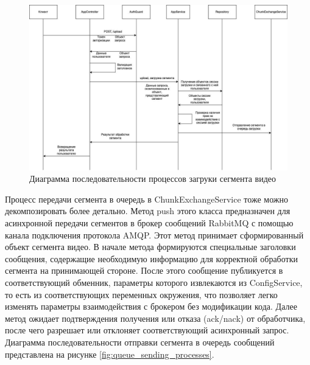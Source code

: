 	\begin{figure}[ht!] 
		\center
		\includegraphics [scale=0.37] {my_folder/images//chunk_upload_processes}
		\caption{Диаграмма последовательности процессов загруки сегмента видео} 
		\label{fig:chunk_upload_processes}  
	\end{figure}

	Процесс передачи сегмента в очередь в ChunkExchangeService тоже можно декомпозировать более детально. Метод push этого класса предназначен для асинхронной передачи сегментов в брокер сообщений RabbitMQ с помощью канала подключения протокола AMQP. Этот метод принимает сформированный объект сегмента видео. В начале метода формируются специальные заголовки сообщения, содержащие необходимую информацию для корректной обработки сегмента на принимающей стороне. После этого сообщение публикуется в соответствующий обменник, параметры которого извлекаются из ConfigService, то есть из соответствующих переменных окружения, что позволяет легко изменять параметры взаимодействия с брокером без модификации кода. Далее метод ожидает подтверждения получения или отказа (ack/nack) от обработчика, после чего разрешает или отклоняет соответствующий асинхронный запрос. Диаграмма последовательности отправки сегмента в очередь сообщений представлена на рисунке \ref{fig:queue_sending_processes}.

